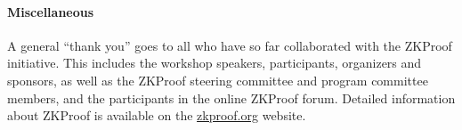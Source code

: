 \paragraph{Miscellaneous}
A general ``thank you'' goes to all who have so far collaborated with the ZKProof initiative.
This includes the workshop speakers, participants, organizers and sponsors, as well as the ZKProof steering committee and program committee members, and the participants in the online ZKProof forum.
Detailed information about ZKProof is available on the \href{https://zkproof.org/}{zkproof.org} website.
